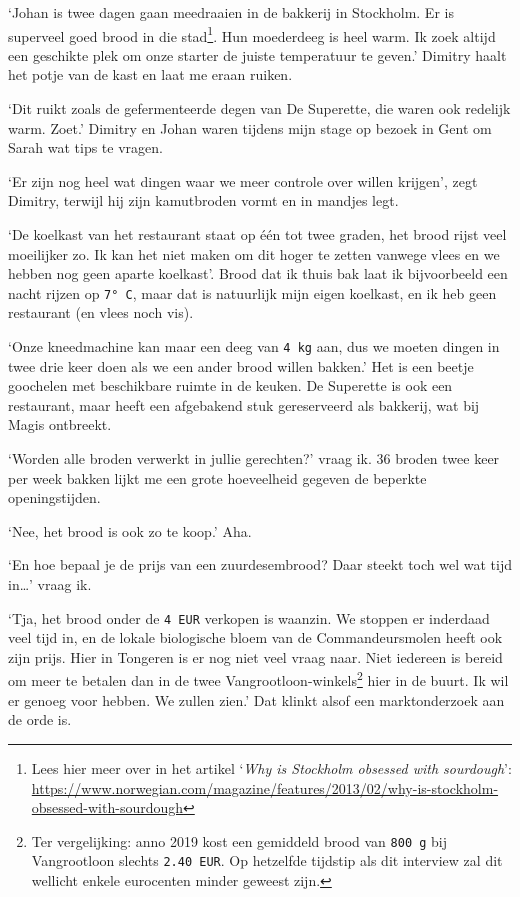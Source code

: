 \documentclass[
  11pt,
  dutch,
]{memoir}
\begin{document}
`Johan is twee dagen gaan meedraaien in de bakkerij in Stockholm. Er is
superveel goed brood in die stad\footnote{Lees hier meer over in het
  artikel `\emph{Why is Stockholm obsessed with sourdough}':
  \url{https://www.norwegian.com/magazine/features/2013/02/why-is-stockholm-obsessed-with-sourdough}}.
Hun moederdeeg is heel warm. Ik zoek altijd een geschikte plek om onze
starter de juiste temperatuur te geven.' Dimitry haalt het potje van de
kast en laat me eraan ruiken.

`Dit ruikt zoals de gefermenteerde degen van De Superette, die waren ook
redelijk warm. Zoet.' Dimitry en Johan waren tijdens mijn stage op
bezoek in Gent om Sarah wat tips te vragen.

`Er zijn nog heel wat dingen waar we meer controle over willen krijgen',
zegt Dimitry, terwijl hij zijn kamutbroden vormt en in mandjes legt.

`De koelkast van het restaurant staat op één tot twee graden, het brood
rijst veel moeilijker zo. Ik kan het niet maken om dit hoger te zetten
vanwege vlees en we hebben nog geen aparte koelkast'. Brood dat ik thuis
bak laat ik bijvoorbeeld een nacht rijzen op \texttt{7°\ C}, maar dat is
natuurlijk mijn eigen koelkast, en ik heb geen restaurant (en vlees noch
vis).

`Onze kneedmachine kan maar een deeg van \texttt{4\ kg} aan, dus we
moeten dingen in twee drie keer doen als we een ander brood willen
bakken.' Het is een beetje goochelen met beschikbare ruimte in de
keuken. De Superette is ook een restaurant, maar heeft een afgebakend
stuk gereserveerd als bakkerij, wat bij Magis ontbreekt.

`Worden alle broden verwerkt in jullie gerechten?' vraag ik. 36 broden
twee keer per week bakken lijkt me een grote hoeveelheid gegeven de
beperkte openingstijden.

`Nee, het brood is ook zo te koop.' Aha.

`En hoe bepaal je de prijs van een zuurdesembrood? Daar steekt toch wel
wat tijd in\ldots{}' vraag ik.

`Tja, het brood onder de \texttt{4\ EUR} verkopen is waanzin. We stoppen
er inderdaad veel tijd in, en de lokale biologische bloem van de
Commandeursmolen heeft ook zijn prijs. Hier in Tongeren is er nog niet
veel vraag naar. Niet iedereen is bereid om meer te betalen dan in de
twee Vangrootloon-winkels\footnote{Ter vergelijking: anno 2019 kost een
  gemiddeld brood van \texttt{800\ g} bij Vangrootloon slechts
  \texttt{2.40\ EUR}. Op hetzelfde tijdstip als dit interview zal dit
  wellicht enkele eurocenten minder geweest zijn.} hier in de buurt. Ik
wil er genoeg voor hebben. We zullen zien.' Dat klinkt alsof een
marktonderzoek aan de orde is.
\end{document}
